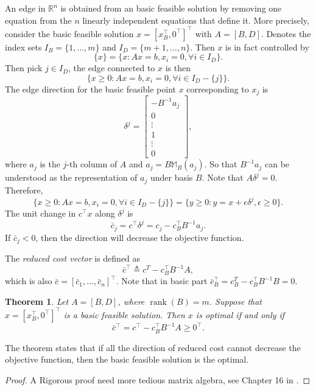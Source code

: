 \documentclass[12pt,a4paper]{report}
\numberwithin{equation}{section}
\theoremstyle{mystyle}
\newtheorem{theorem}[definition]{Theorem}
\newcommand{\R}{\mathbb{R}}
\newcommand{\T}{\top}
\newcommand{\rank}{\operatorname{rank}}
\begin{document}
	An edge in $\R^n$ is obtained from an basic feasible solution by removing one equation from the $n$ linearly independent equations that define it. More precisely, consider the basic feasible solution $x=[x_B^\T,0^\T]^\T$ with $A=[B,D]$. Denotes the index sets $I_B=\{1,\dots,m\}$ and $I_D=\{m+1,\dots,n\}$. Then $x$ is in fact controlled by
	$$
	\{x\}=\{x: Ax=b, x_i=0, \forall i\in I_D\}.
	$$
	Then pick $j\in I_D$, the edge connected to $x$ is then
	$$
	\{x\geq 0: Ax=b,x_i=0,\forall i\in I_D-\{j\}\}.
	$$
	The edge direction for the basic feasible point $x$ corresponding to $x_j$ is
	$$
	\delta^j =
	\begin{bmatrix}
		-B^{-1}a_j\\
		0\\
		\vdots\\
		1\\
		\vdots\\
		0
	\end{bmatrix},
	$$
	where $a_j$ is the $j$-th column of $A$ and $a_j=B \mathbb{M}_B(a_j)$. So that $B^{-1} a_j$ can be understood as the representation of $a_j$ under basis $B$. Note that $A\delta^j=0$. Therefore,
	\begin{equation}\label{eq:feasible direction}
		\{x\geq 0: Ax=b,x_i=0,\forall i\in I_D-\{j\}\}=\{y\geq 0:y=x+\epsilon \delta^j,\epsilon\geq 0\}.
	\end{equation}
	The unit change in $c^\T x$ along $\delta^j$ is 
	$$
	\bar{c}_j = c^\T \delta^j=c_j-c_B^\T B^{-1}a_j.
	$$
	If $\bar{c}_j<0$, then the direction will decrease the objective function.
	
	The \emph{reduced cost vector} is defined as
	$$
	\bar{c}^\T \triangleq c^T - c_B^\T B^{-1} A,
	$$
	which is also $\bar{c} = [\bar{c}_1,\dots,\bar{c}_n]^\T$. Note that in basic part $\bar{c}_B^\T = c_B^T - c_B^\T B^{-1} B=0$.
	
	\begin{theorem}
		Let $A=[B,D]$, where $\rank(B)=m$. Suppose that $x=[x_B^\T,0^\T]^\T$ is a basic feasible solution. Then $x$ is optimal if and only if 
		$$\bar{c}^\T = c^\T - c_B^\T B^{-1}A\geq 0^\T.$$
	\end{theorem}
	The theorem states that if all the direction of reduced cost cannot decrease the objective function, then the basic feasible solution is the optimal.
	\begin{proof}
		A Rigorous proof need more tedious matrix algebra, see Chapter 16 in \cite{chong2004introduction}.
	\end{proof}
	
\end{document}
